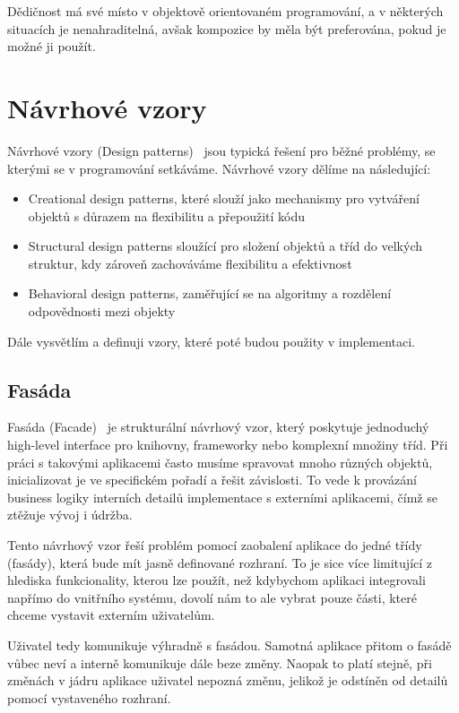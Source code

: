 Dědičnost má své místo v objektově orientovaném programování, a v některých situacích je nenahraditelná, avšak kompozice by měla být preferována, pokud je možné ji použít.

\section{Návrhové vzory}

Návrhové vzory (Design patterns)~\cite{DesignPatterns} jsou typická řešení pro běžné problémy, se kterými se v programování setkáváme. Návrhové vzory dělíme na následující:

\begin{itemize}
    \item Creational design patterns, které slouží jako mechanismy pro vytváření objektů s důrazem na flexibilitu a přepoužití kódu
    \item Structural design patterns sloužící pro složení objektů a tříd do velkých struktur, kdy zároveň zachováváme flexibilitu a efektivnost
    \item Behavioral design patterns, zaměřující se na algoritmy a rozdělení odpovědnosti mezi objekty
\end{itemize}

Dále vysvětlím a definuji vzory, které poté budou použity v implementaci.

\subsection{Fasáda}
\label{facade}

Fasáda (Facade)~\cite{Fasade} je strukturální návrhový vzor, který poskytuje jednoduchý high-level interface pro knihovny, frameworky nebo komplexní množiny tříd. Při práci s takovými aplikacemi často musíme spravovat mnoho různých objektů, inicializovat je ve specifickém pořadí a řešit závislosti. To vede k provázání business logiky interních detailů implementace s externími aplikacemi, čímž se ztěžuje vývoj i údržba.

Tento návrhový vzor řeší problém pomocí zaobalení aplikace do jedné třídy (fasády), která bude mít jasně definované rozhraní. To je sice více limitující z hlediska funkcionality, kterou lze použít, než kdybychom aplikaci integrovali napřímo do vnitřního systému, dovolí nám to ale vybrat pouze části, které chceme vystavit externím uživatelům.

Uživatel tedy komunikuje výhradně s fasádou. Samotná aplikace přitom o fasádě vůbec neví a interně komunikuje dále beze změny. Naopak to platí stejně, při změnách v jádru aplikace uživatel nepozná změnu, jelikož je odstíněn od detailů pomocí vystaveného rozhraní.


